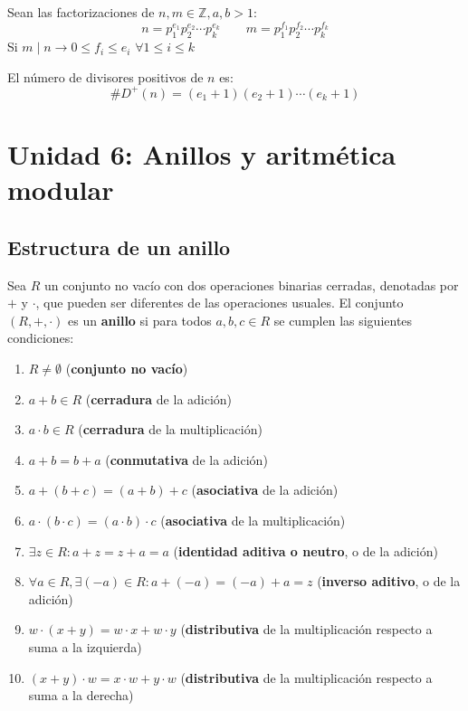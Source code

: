 \documentclass[12pt]{article}
\begin{document}
\begin{tcolorbox}
    Sean las factorizaciones de \( n,m \in \mathbb{Z}, a,b > 1\):
        \[ n = p_1^{e_1} p_2^{e_2} \cdots p_k^{e_k} \qquad
        m = p_1^{f_1} p_2^{f_2} \cdots p_k^{f_k} \]
    Si \( m \mid n \rightarrow 0 \leqslant f_i \leqslant e_i \) \( \forall 1 \leqslant i \leqslant k \)

    El número de divisores positivos de \( n \) es:
    \[ \# D^{+}(n) = (e_1 + 1)(e_2 + 1) \cdots (e_k + 1) \]
\end{tcolorbox}
\newpage

\section{Unidad 6: Anillos y aritmética modular}

\subsection*{Estructura de un anillo}

\begin{tcolorbox}[title=Definición de anillo]
Sea \( R \) un conjunto no vacío con dos operaciones binarias cerradas, denotadas por \( + \) y \( \cdot \), que pueden ser diferentes de las operaciones usuales. El conjunto \( (R, +, \cdot) \) es un \textbf{anillo} si para todos \( a, b, c \in R \) se cumplen las siguientes condiciones:
\begin{enumerate}
    \item \( R \neq \emptyset \) (\textbf{conjunto no vacío})
    \item \( a + b \in R \) (\textbf{cerradura} de la adición)
    \item \( a \cdot b \in R \) (\textbf{cerradura} de la multiplicación)
    \item \( a + b = b + a \) (\textbf{conmutativa} de la adición)
    \item \( a + (b + c) = (a + b) + c \) (\textbf{asociativa} de la adición)
    \item \( a \cdot (b \cdot c) = (a \cdot b) \cdot c \) (\textbf{asociativa} de la multiplicación)
    \item \( \exists z \in R : a + z = z + a = a \) (\textbf{identidad aditiva o neutro}, o de la adición)
    \item \( \forall a \in R, \exists (-a) \in R : a + (-a) = (-a) + a = z \) (\textbf{inverso aditivo}, o de la adición)
    \item \( w \cdot (x + y) = w \cdot x + w \cdot y \) (\textbf{distributiva} de la multiplicación respecto a suma a la izquierda)
    \item \( (x + y) \cdot w = x \cdot w + y \cdot w \) (\textbf{distributiva} de la multiplicación respecto a suma a la derecha)
\end{enumerate}
\end{tcolorbox}
\end{document}
